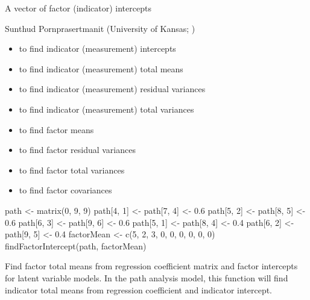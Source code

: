 \documentclass[a4paper]{book}
\begin{document}
%
\begin{Value}
A vector of factor (indicator) intercepts
\end{Value}
%
\begin{Author}\relax
Sunthud Pornprasertmanit (University of Kansas; )
\end{Author}
%
\begin{SeeAlso}\relax
\begin{itemize}

\item {} to find indicator (measurement) intercepts
\item {} to find indicator (measurement) total means
\item {} to find indicator (measurement) residual variances
\item {} to find indicator (measurement) total variances
\item {} to find factor means
\item {} to find factor residual variances
\item {} to find factor total variances
\item {} to find factor covariances

\end{itemize}

\end{SeeAlso}
%
\begin{Examples}
\begin{ExampleCode}
path <- matrix(0, 9, 9)
path[4, 1] <- path[7, 4] <- 0.6
path[5, 2] <- path[8, 5] <- 0.6
path[6, 3] <- path[9, 6] <- 0.6
path[5, 1] <- path[8, 4] <- 0.4
path[6, 2] <- path[9, 5] <- 0.4
factorMean <- c(5, 2, 3, 0, 0, 0, 0, 0, 0)
findFactorIntercept(path, factorMean)
\end{ExampleCode}
\end{Examples}
%
\begin{Description}\relax
Find factor total means from regression coefficient matrix and factor intercepts for latent variable models. In the path analysis model, this function will find indicator total means from regression coefficient and indicator intercept.
\end{Description}
\end{document}
